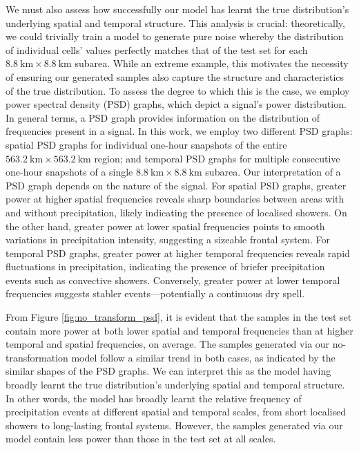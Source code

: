 \documentclass[ oneside,%
                    author={George Herbert},
                    degree={MSci},
                     title={Video Diffusion Models for Climate Simulations},
                  subtitle={}]{dissertation}
\begin{document}
We must also assess how successfully our model has learnt the true distribution's underlying spatial and temporal structure. This analysis is crucial: theoretically, we could trivially train a model to generate pure noise whereby the distribution of individual cells' values perfectly matches that of the test set for each $8.8\ \mathrm{km}\times 8.8\ \mathrm{km}$ subarea. While an extreme example, this motivates the necessity of ensuring our generated samples also capture the structure and characteristics of the true distribution. To assess the degree to which this is the case, we employ power spectral density (PSD) graphs, which depict a signal's power distribution. In general terms, a PSD graph provides information on the distribution of frequencies present in a signal. In this work, we employ two different PSD graphs: spatial PSD graphs for individual one-hour snapshots of the entire $563.2\ \mathrm{km}\times 563.2\ \mathrm{km}$ region; and temporal PSD graphs for multiple consecutive one-hour snapshots of a single $8.8\ \mathrm{km}\times 8.8\ \mathrm{km}$ subarea. Our interpretation of a PSD graph depends on the nature of the signal. For spatial PSD graphs, greater power at higher spatial frequencies reveals sharp boundaries between areas with and without precipitation, likely indicating the presence of localised showers. On the other hand, greater power at lower spatial frequencies points to smooth variations in precipitation intensity, suggesting a sizeable frontal system. For temporal PSD graphs, greater power at higher temporal frequencies reveals rapid fluctuations in precipitation, indicating the presence of briefer precipitation events such as convective showers. Conversely, greater power at lower temporal frequencies suggests stabler events---potentially a continuous dry spell. 

From Figure \ref{fig:no_transform_psd}, it is evident that the samples in the test set contain more power at both lower spatial and temporal frequencies than at higher temporal and spatial frequencies, on average. The samples generated via our no-transformation model follow a similar trend in both cases, as indicated by the similar shapes of the PSD graphs. We can interpret this as the model having broadly learnt the true distribution's underlying spatial and temporal structure. In other words, the model has broadly learnt the relative frequency of precipitation events at different spatial and temporal scales, from short localised showers to long-lasting frontal systems. However, the samples generated via our model contain less power than those in the test set at all scales.
\end{document}

